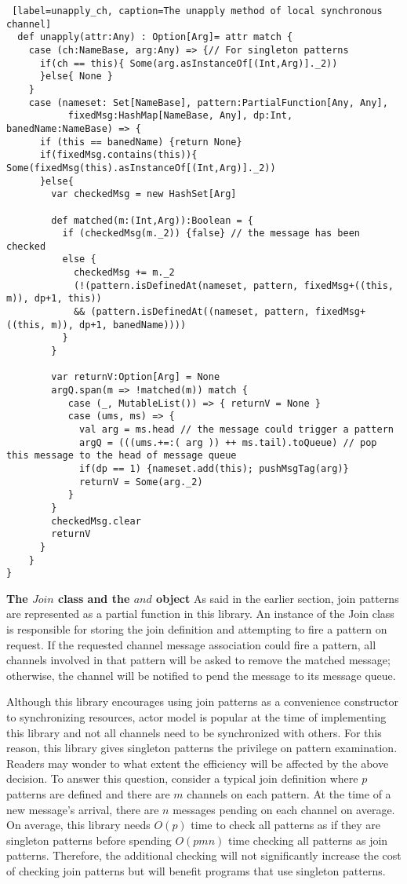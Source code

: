 \begin{lstlisting} [label=unapply_ch, caption=The unapply method of local synchronous channel]
  def unapply(attr:Any) : Option[Arg]= attr match { 
    case (ch:NameBase, arg:Any) => {// For singleton patterns
      if(ch == this){ Some(arg.asInstanceOf[(Int,Arg)]._2))
      }else{ None }
    }
    case (nameset: Set[NameBase], pattern:PartialFunction[Any, Any], 
           fixedMsg:HashMap[NameBase, Any], dp:Int, banedName:NameBase) => {
      if (this == banedName) {return None}      
      if(fixedMsg.contains(this)){ Some(fixedMsg(this).asInstanceOf[(Int,Arg)]._2))
      }else{        
        var checkedMsg = new HashSet[Arg]
        
        def matched(m:(Int,Arg)):Boolean = {
          if (checkedMsg(m._2)) {false} // the message has been checked
          else { 
            checkedMsg += m._2
            (!(pattern.isDefinedAt(nameset, pattern, fixedMsg+((this, m)), dp+1, this))
            && (pattern.isDefinedAt((nameset, pattern, fixedMsg+((this, m)), dp+1, banedName))))
          }
        }
        
        var returnV:Option[Arg] = None
        argQ.span(m => !matched(m)) match {
           case (_, MutableList()) => { returnV = None }
           case (ums, ms) => {
             val arg = ms.head // the message could trigger a pattern
             argQ = (((ums.+=:( arg )) ++ ms.tail).toQueue) // pop this message to the head of message queue
             if(dp == 1) {nameset.add(this); pushMsgTag(arg)}
             returnV = Some(arg._2)
           }
        }
        checkedMsg.clear
        returnV
      }
    }
}
\end{lstlisting}

{\bf{The $Join$ class and the $and$ object}}
\label{join_and}
As said in the earlier section, join patterns are represented as a partial function in this library.  An instance of the Join class is responsible for storing the join definition and attempting to fire a pattern on request.  If the requested channel message association could fire a pattern, all channels involved in that pattern will be asked to remove the matched message;  otherwise, the channel will be notified to pend the message to its message queue.

Although this library encourages using join patterns as a convenience constructor to synchronizing resources, actor model is popular at the time of implementing this library and not all channels need to be synchronized with others.  For this reason, this library gives singleton patterns the privilege on pattern examination.  Readers may wonder to what extent the efficiency will be affected by the above decision.  To answer this question, consider a typical join definition where $p$ patterns are defined and there are $m$ channels on each pattern.  At the time of a new message's arrival, there are $n$ messages pending on each channel on average.  On average, this library needs $O(p)$ time to check all patterns as if they are singleton patterns before spending $O(pmn)$ time checking all patterns as join patterns.  Therefore, the additional checking will not significantly increase the cost of checking join patterns but will benefit programs that use singleton patterns.

